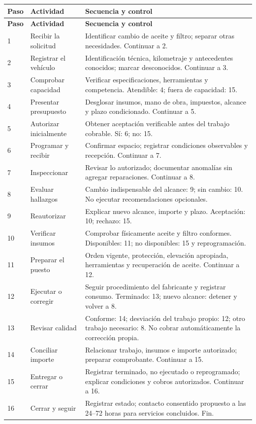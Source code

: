 {\begin{longtable}{@{}p{.07\linewidth}p{.27\linewidth}p{.57\linewidth}@{}}
\toprule
\textbf{Paso} & \textbf{Actividad} & \textbf{Secuencia y control}\\
\midrule\endfirsthead
\toprule\textbf{Paso} & \textbf{Actividad} & \textbf{Secuencia y control}\\\midrule\endhead
1 & Recibir la solicitud & Identificar cambio de aceite y filtro; separar otras necesidades. Continuar a 2.\\
2 & Registrar el vehículo & Identificación técnica, kilometraje y antecedentes conocidos; marcar desconocidos. Continuar a 3.\\
3 & Comprobar capacidad & Verificar especificaciones, herramientas y competencia. Atendible: 4; fuera de capacidad: 15.\\
4 & Presentar presupuesto & Desglosar insumos, mano de obra, impuestos, alcance y plazo condicionado. Continuar a 5.\\
5 & Autorizar inicialmente & Obtener aceptación verificable antes del trabajo cobrable. Sí: 6; no: 15.\\
6 & Programar y recibir & Confirmar espacio; registrar condiciones observables y recepción. Continuar a 7.\\
7 & Inspeccionar & Revisar lo autorizado; documentar anomalías sin agregar reparaciones. Continuar a 8.\\
8 & Evaluar hallazgos & Cambio indispensable del alcance: 9; sin cambio: 10. No ejecutar recomendaciones opcionales.\\
9 & Reautorizar & Explicar nuevo alcance, importe y plazo. Aceptación: 10; rechazo: 15.\\
10 & Verificar insumos & Comprobar físicamente aceite y filtro conformes. Disponibles: 11; no disponibles: 15 y reprogramación.\\
11 & Preparar el puesto & Orden vigente, protección, elevación apropiada, herramientas y recuperación de aceite. Continuar a 12.\\
12 & Ejecutar o corregir & Seguir procedimiento del fabricante y registrar consumo. Terminado: 13; nuevo alcance: detener y volver a 8.\\
13 & Revisar calidad & Conforme: 14; desviación del trabajo propio: 12; otro trabajo necesario: 8. No cobrar automáticamente la corrección propia.\\
14 & Conciliar importe & Relacionar trabajo, insumos e importe autorizado; preparar comprobante. Continuar a 15.\\
15 & Entregar o cerrar & Registrar terminado, no ejecutado o reprogramado; explicar condiciones y cobros autorizados. Continuar a 16.\\
16 & Cerrar y seguir & Registrar estado; contacto consentido propuesto a las 24--72 horas para servicios concluidos. Fin.\\
\bottomrule\end{longtable}

}
